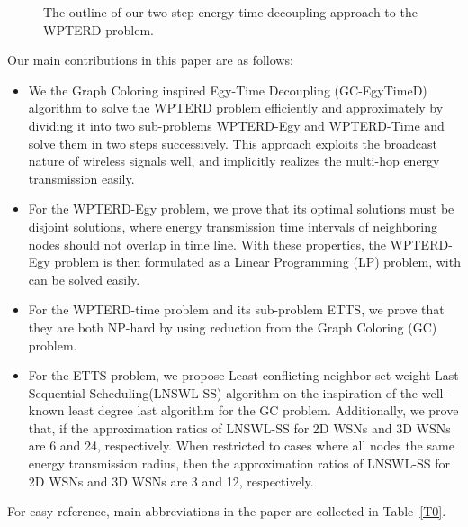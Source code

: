 \documentclass[journal,10pt]{IEEEtran}
\begin{document}
\begin{figure}[htb]
\caption{The outline of our two-step energy-time decoupling approach to the WPTERD problem.}
\label{fig_outline}
\end{figure}

Our main contributions in this paper are as follows:

\begin{itemize}
\item{We the Graph Coloring inspired Egy-Time Decoupling (GC-EgyTimeD) algorithm to solve the WPTERD problem efficiently and approximately by dividing it into two sub-problems WPTERD-Egy and WPTERD-Time and solve them in two steps successively. This approach exploits the broadcast nature of wireless signals well, and implicitly realizes the multi-hop energy transmission easily.}
\item{For the WPTERD-Egy problem, we prove that its optimal solutions must be disjoint solutions, where energy transmission time intervals of neighboring nodes should not overlap in time line. With these properties, the WPTERD-Egy problem is then formulated as a Linear Programming (LP) problem, with can be solved easily.}
\item{For the WPTERD-time problem and its sub-problem ETTS, we prove that they are both NP-hard by using reduction from the Graph Coloring (GC) problem.}
\item{For the ETTS problem, we propose Least conflicting-neighbor-set-weight Last Sequential Scheduling(LNSWL-SS) algorithm on the inspiration of the well-known least degree last algorithm for the GC problem. Additionally, we prove that, if the approximation ratios of LNSWL-SS for 2D WSNs and 3D WSNs are 6 and 24, respectively. When restricted to cases where all nodes the same energy transmission radius, then the approximation ratios of LNSWL-SS for 2D WSNs and 3D WSNs are 3 and 12, respectively.}
\end{itemize}

For easy reference, main abbreviations in the paper are collected in Table~\ref{T0}.
\end{document}

